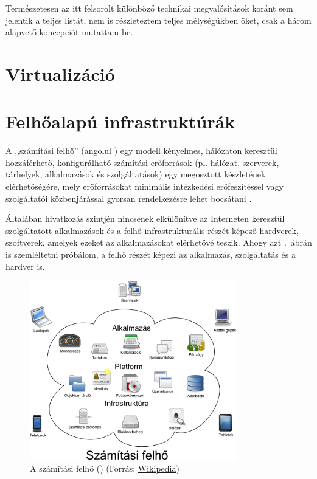 Természetesen az itt felsorolt különböző technikai megvalósítások koránt sem jelentik a teljes listát, nem is részleteztem teljes mélységükben őket, csak a három alapvető koncepciót mutattam be.

\section{Virtualizáció}


\section{Felhőalapú infrastruktúrák}

A ,,számítási felhő'' (angolul ) egy modell kényelmes, hálózaton keresztül hozzáférhető, konfigurálható számítási erőforrások (pl. hálózat, szerverek, tárhelyek, alkalmazások és szolgáltatások) egy megosztott készletének elérhetőségére, mely erőforrásokat minimális intézkedési erőfeszítéssel vagy szolgáltatói közbenjárással gyorsan rendelkezésre lehet bocsátani \cite{nistsp800-145}.

Általában hivatkozás szintjén nincsenek elkülönítve az Interneten keresztül szolgáltatott alkalmazások és a felhő infrastrukturális részét képező hardverek, szoftverek, amelyek ezeket az alkalmazásokat elérhetővé teszik. Ahogy azt .~ábrán is szemléltetni próbálom, a felhő részét képezi az alkalmazás, szolgáltatás és a hardver is.

\begin{figure}[h!]
\centering
\includegraphics[width=0.80\textwidth]{figures/Cloud_computing_hu.png}
\caption{A számítási felhő () (Forrás: \href{https://en.wikipedia.org/wiki/File:Cloud\_computing.svg}{Wikipedia})} \label{fig:cloud_computing_hu}
\end{figure}

